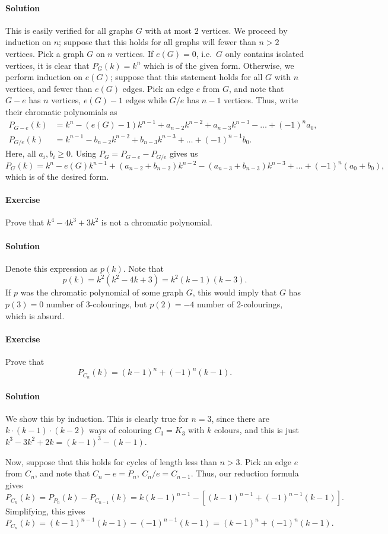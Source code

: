 \documentclass[10pt]{article}
\newcounter{prob}
\newcommand{\problem}{\stepcounter{prob}\paragraph{Exercise \arabic{prob}}}
\newcommand{\solution}{\paragraph{Solution}}
\begin{document}
    \solution This is easily verified for all graphs $G$ with at most $2$ vertices.
    We proceed by induction on $n$; suppose that this holds for all graphs will fewer
    than $n > 2$ vertices. Pick a graph $G$ on $n$ vertices. If $e(G) = 0$, i.e.\ $G$
    only contains isolated vertices, it is clear that $P_G(k) = k^n$ which is of the
    given form. Otherwise, we perform induction on $e(G)$; suppose that this
    statement holds for all $G$ with $n$ vertices, and fewer than $e(G)$ edges. Pick
    an edge $e$ from $G$, and note that $G - e$ has $n$ vertices, $e(G) - 1$ edges
    while $G/e$ has $n - 1$ vertices. Thus, write their chromatic polynomials as 
    \begin{align*}
        P_{G - e}(k) &= k^n - (e(G) - 1)k^{n - 1} + a_{n - 2}k^{n - 2} + a_{n - 3}k^{n
        - 3} - \dots + (-1)^na_0, \\
        P_{G/e}(k) &= k^{n - 1} - b_{n - 2}k^{n - 2} + b_{n - 3}k^{n - 3} + \dots +
        (-1)^{n - 1}b_0.
    \end{align*}
    Here, all $a_i, b_i \geq 0$. Using $P_{G} = P_{G - e} - P_{G/e}$ gives us \[
        P_G(k) = k^n - e(G)k^{n - 1} + (a_{n - 2} + b_{n - 2})k^{n - 2} - (a_{n - 3}
        + b_{n - 3})k^{n - 3} + \dots + (-1)^n(a_0 + b_0),
    \] which is of the desired form.



    \problem Prove that $k^4 - 4k^3 + 3k^2$ is not a chromatic polynomial.

    \solution Denote this expression as $p(k)$. Note that \[
        p(k) = k^2(k^2- 4k + 3) = k^2(k - 1)(k - 3).
    \] If $p$ was the chromatic polynomial of some graph $G$, this would imply that
    $G$ has $p(3) = 0$ number of 3-colourings, but $p(2) = -4$ number of
    2-colourings, which is absurd.


    \problem Prove that \[
        P_{C_n}(k) = (k - 1)^n + (-1)^n(k - 1).
    \] 

    \solution We show this by induction. This is clearly true for $n = 3$, since
    there are $k\cdot(k - 1)\cdot(k - 2)$ ways of colouring $C_3 = K_3$ with $k$
    colours, and this is just $k^3 - 3k^2 + 2k = (k - 1)^3 - (k - 1)$.

    Now, suppose that this holds for cycles of length less than $n > 3$. Pick an edge
    $e$ from $C_n$, and note that $C_n - e = P_n$, $C_n / e = C_{n - 1}$. Thus, our
    reduction formula gives \[
        P_{C_n}(k) = P_{P_n}(k) - P_{C_{n - 1}}(k) = k(k - 1)^{n - 1} - \left[(k -
        1)^{n - 1} + (-1)^{n - 1}(k - 1)\right].
    \] Simplifying, this gives \[
        P_{C_n}(k) = (k - 1)^{n - 1}(k - 1) - (-1)^{n - 1}(k - 1) = (k - 1)^n +
        (-1)^n(k - 1).
    \] 
\end{document}
